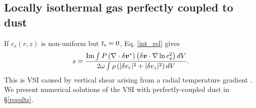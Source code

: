 



\subsection{Locally isothermal gas perfectly coupled to dust}\label{dusty_vsi_int}
If $c_s(r,z)$ is non-uniform but $t_\mathrm{s}=0$, Eq. \ref{int_rel} 
gives  
\begin{align}
  s = \frac{\operatorname{Im}\int P
  \left(\nabla\cdot\delta\bm{v}^*\right)\left(\delta\bm{v}\cdot\nabla\ln{c_s^2}\right)dV}{2\omega\int\rho\left(|\delta
    v_r|^2 + |\delta v_z|^2\right)dV}. \label{vsi_check}
\end{align} 
This is VSI caused by vertical shear arising from a radial
temperature gradient \citep{nelson13,barker15,lin15}. We present 
numerical solutions of the VSI with perfectly-coupled dust in \S\ref{results}. 

